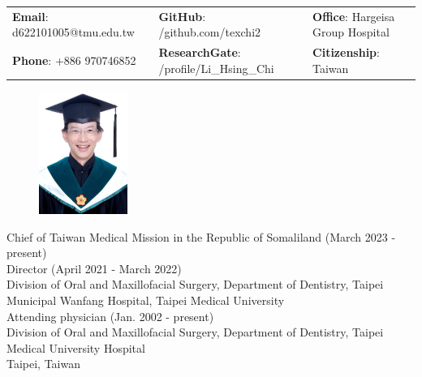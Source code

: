 \documentclass[letterpaper, 11pt]{article}
\begin{document}


\vspace{0.5cm} 
\begin{center}
\begin{tabular}{lll}
\textbf{Email}: d622101005@tmu.edu.tw      &
\hspace{0.2cm} \textbf{GitHub}: /github.com/texchi2    &
\hspace{0.2cm} 	\textbf{Office}: Hargeisa Group Hospital \\ %

\textbf{Phone}: +886 970746852   & 
\hspace{0.2cm} \textbf{ResearchGate}: 
/profile/Li\_Hsing\_Chi &
\hspace{0.2cm} \textbf{Citizenship}: Taiwan 
\end{tabular}
\end{center}

\begin{figure}
    \centering
    \includegraphics[height=40mm]{IMG_33A79667EE44-Tex_TMU_portrait_PhD.jpeg}%
\end{figure}

\noindent
Chief of Taiwan Medical Mission in the Republic of Somaliland (March 2023 - present) \\
Director (April 2021 - March 2022)\\
Division of Oral and Maxillofacial Surgery, Department of Dentistry, Taipei Municipal Wanfang Hospital, Taipei Medical University\\[4mm]
Attending physician (Jan. 2002 - present)\\
Division of Oral and Maxillofacial Surgery, Department of Dentistry,
Taipei Medical University Hospital\\
Taipei, Taiwan\\
\end{document}
